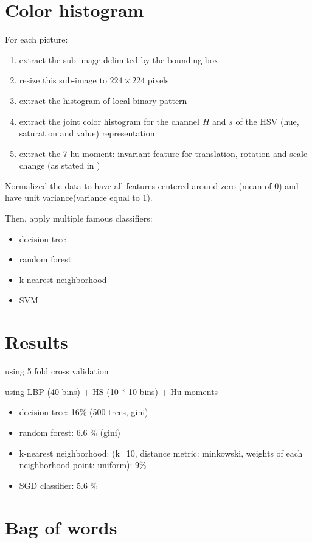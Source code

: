 \section{Color histogram}

For each picture:
\begin{enumerate}
    \item extract the sub-image delimited by the bounding box
    \item resize this sub-image to $224 \times 224$ pixels
    \item extract the histogram of local binary pattern
    \item extract the joint color histogram for the channel $H$ and $s$ of the HSV (hue, saturation and value) representation
    \item extract the 7 hu-moment: invariant feature for translation, rotation and scale change (as stated in \cite{Hu1962})
\end{enumerate}

Normalized the data to have all features centered around zero (mean of 0) and have unit variance(variance equal to 1).

Then, apply multiple famous classifiers:
\begin{itemize}
    \item decision tree
    \item random forest
    \item k-nearest neighborhood
    \item SVM
\end{itemize}

\section{Results}

using 5 fold cross validation

using LBP (40 bins) + HS (10 * 10 bins) + Hu-moments
\begin{itemize}
    \item decision tree: 16\% (500 trees, gini)
    \item random forest: 6.6 \% (gini)
    \item k-nearest neighborhood: (k=10, distance metric: minkowski, weights of each neighborhood point: uniform): 9\%
    \item SGD classifier:  5.6 \%
\end{itemize}

\section{Bag of words}

